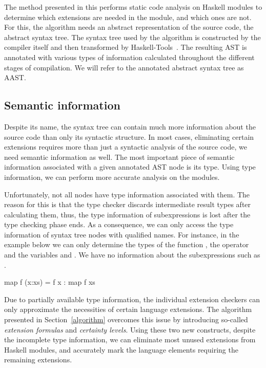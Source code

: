 \documentclass[main.tex]{subfiles}
\begin{document}
	
	The method presented in this \paper{} performs static code analysis on Haskell modules to determine which extensions are needed in the module, and which ones are not. For this, the algorithm needs an abstract representation of the source code, the abstract syntax tree. The syntax tree used by the algorithm is constructed by the compiler itself and then transformed by Haskell-Tools~\cite{haskell-tools-bib}. The resulting AST is annotated with various types of information calculated throughout the different stages of compilation. We will refer to the annotated abstract syntax tree as AAST.
	
	\subsection{Semantic information}
	
	
	Despite its name, the syntax tree can contain much more information about the source code than only its syntactic structure. In most cases, eliminating certain extensions requires more than just a syntactic analysis of the source code, we need semantic information as well. The most important piece of semantic information associated with a given annotated AST node is its type. Using type information, we can perform more accurate analysis on the modules.
	
	Unfortunately, not all nodes have type information associated with them. The reason for this is that the type checker discards intermediate result types after calculating them, thus, the type information of subexpressions is lost after the type checking phase ends. As a consequence, we can only access the type information of syntax tree nodes with qualified names. For instance, in the example below we can only determine the types of the function , the operator \ilcode{(:)} and the variables  and . We have no information about the subexpressions such as .
	
	\begin{oneLineHaskell}
		map f (x:xs) = f x : map f xs
	\end{oneLineHaskell}
	
	Due to partially available type information, the individual extension checkers can only approximate the necessities of certain language extensions. The algorithm presented in Section~\ref{algorithm} overcomes this issue by introducing so-called \emph{extension formulas} and \emph{certainty levels}. Using these two new constructs, despite the incomplete type information, we can eliminate most unused extensions from Haskell modules, and accurately mark the language elements requiring the remaining extensions.
	
\end{document}
